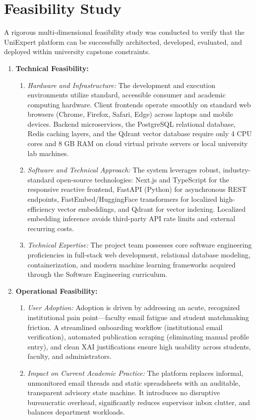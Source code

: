 \section{Feasibility Study}
\label{sec:feasibility}

A rigorous multi-dimensional feasibility study was conducted to verify that the UniExpert platform can be successfully architected, developed, evaluated, and deployed within university capstone constraints.

\begin{enumerate}[label=\textbf{\arabic*.}]
    \item \textbf{Technical Feasibility:}
    \begin{enumerate}[label=(\alph*)]
        \item \textit{Hardware and Infrastructure:} The development and execution environments utilize standard, accessible consumer and academic computing hardware. Client frontends operate smoothly on standard web browsers (Chrome, Firefox, Safari, Edge) across laptops and mobile devices. Backend microservices, the PostgreSQL relational database, Redis caching layers, and the Qdrant vector database require only 4 CPU cores and 8 GB RAM on cloud virtual private servers or local university lab machines.
        \item \textit{Software and Technical Approach:} The system leverages robust, industry-standard open-source technologies: Next.js and TypeScript for the responsive reactive frontend, FastAPI (Python) for asynchronous REST endpoints, FastEmbed/HuggingFace transformers for localized high-efficiency vector embeddings, and Qdrant for vector indexing. Localized embedding inference avoids third-party API rate limits and external recurring costs.
        \item \textit{Technical Expertise:} The project team possesses core software engineering proficiencies in full-stack web development, relational database modeling, containerization, and modern machine learning frameworks acquired through the Software Engineering curriculum.
    \end{enumerate}

    \item \textbf{Operational Feasibility:}
    \begin{enumerate}[label=(\alph*)]
        \item \textit{User Adoption:} Adoption is driven by addressing an acute, recognized institutional pain point—faculty email fatigue and student matchmaking friction. A streamlined onboarding workflow (institutional email verification), automated publication scraping (eliminating manual profile entry), and clean XAI justifications ensure high usability across students, faculty, and administrators.
        \item \textit{Impact on Current Academic Practice:} The platform replaces informal, unmonitored email threads and static spreadsheets with an auditable, transparent advisory state machine. It introduces no disruptive bureaucratic overhead, significantly reduces supervisor inbox clutter, and balances department workloads.
    \end{enumerate}


\end{enumerate}
